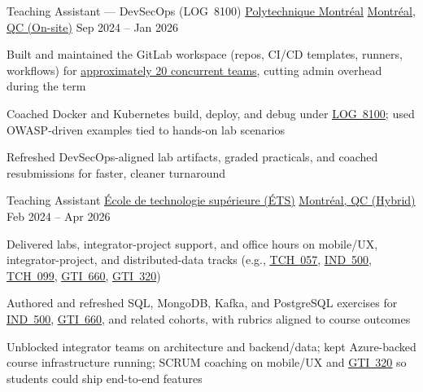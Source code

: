 \begin{cventries}
\cventry
{Teaching Assistant --- DevSecOps (LOG~8100)} %
{\href{https://www.polymtl.ca/}{Polytechnique Montréal}} %
{\href{https://www.google.com/maps/search/?api=1\&query=Montreal,+QC,+Canada}{Montréal, QC (On-site)}} %
{Sep 2024 -- Jan 2026} %
{
\begin{cvitems}
\item {Built and maintained the GitLab workspace (repos, CI/CD templates, runners, workflows) for \uline{approximately 20 concurrent teams}, cutting admin overhead during the term}
\item {Coached Docker and Kubernetes build, deploy, and debug under \href{https://www.polymtl.ca/programmes/cours/devsecops-operations-et-dev-logiciel-secur}{\uline{LOG~8100}}; used OWASP-driven examples tied to hands-on lab scenarios}
\item {Refreshed DevSecOps-aligned lab artifacts, graded practicals, and coached resubmissions for faster, cleaner turnaround}
\end{cvitems}
}

\cventry
{Teaching Assistant} %
{\href{https://www.etsmtl.ca/}{École de technologie supérieure (ÉTS)}} %
{\href{https://www.google.com/maps/search/?api=1\&query=Montreal,+QC,+Canada}{Montréal, QC (Hybrid)}} %
{Feb 2024 -- Apr 2026} %
{
\begin{cvitems}
\item {Delivered labs, integrator-project support, and office hours on mobile/UX, integrator-project, and distributed-data tracks (e.g., \href{https://www.etsmtl.ca/etudes/cours/tch057}{\uline{TCH~057}}, \href{https://www.etsmtl.ca/etudes/cours/ind500}{\uline{IND\ 500}}, \href{https://www.etsmtl.ca/etudes/cours/tch099}{\uline{TCH~099}}, \href{https://www.etsmtl.ca/etudes/cours/gti660}{\uline{GTI~660}}, \href{https://www.etsmtl.ca/etudes/cours/gti320}{\uline{GTI~320}})}
\item {Authored and refreshed SQL, MongoDB, Kafka, and PostgreSQL exercises for \href{https://www.etsmtl.ca/etudes/cours/ind500}{\uline{IND\ 500}}, \href{https://www.etsmtl.ca/etudes/cours/gti660}{\uline{GTI~660}}, and related cohorts, with rubrics aligned to course outcomes}
\item {Unblocked integrator teams on architecture and backend/data; kept Azure-backed course infrastructure running; SCRUM coaching on mobile/UX and \href{https://www.etsmtl.ca/etudes/cours/gti320}{\uline{GTI~320}} so students could ship end-to-end features}
\end{cvitems}
}


\end{cventries}
